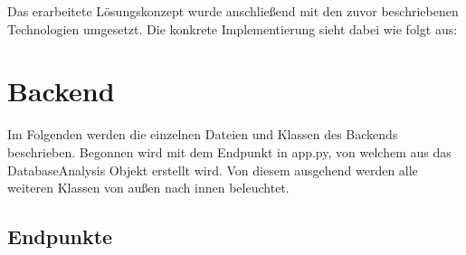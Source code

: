 Das erarbeitete Lösungskonzept wurde anschließend mit den zuvor beschriebenen Technologien umgesetzt.
Die konkrete Implementierung sieht dabei wie folgt aus:

\section{Backend}
\label{sec:backend}

Im Folgenden werden die einzelnen Dateien und Klassen des Backends beschrieben.
Begonnen wird mit dem Endpunkt in app.py, von welchem aus das DatabaseAnalysis Objekt erstellt wird.
Von diesem ausgehend werden alle weiteren Klassen von außen nach innen beleuchtet.

\subsection{Endpunkte}
\label{sub:ba_endpunkte}

